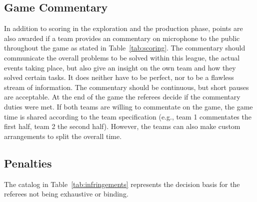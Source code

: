 \documentclass[12pt,twoside]{article}
\newcommand{\reftab}[1]{Table~\ref{#1}}
\begin{document}
\subsection{Game Commentary}
In addition to scoring in the exploration and the production phase,
points are also awarded if a team provides an commentary on
microphone to the public throughout the game as stated in \reftab{tab:scoring}. The commentary should
communicate the overall problems to be solved within this league, the
actual events taking place, but also give an insight on the own team
and how they solved certain tasks. It does neither have to be perfect,
nor to be a flawless stream of information. The commentary should be
continuous, but short pauses are acceptable. At the end of the game
the referees decide if the commentary duties were met. If both teams are willing to commentate
on the game, the game time is shared according to the team
specification (e.g., team 1 commentates the first half, team 2 the
second half). However, the teams can also make custom arrangements to
split the overall time.

\subsection{Penalties}
The catalog in \reftab{tab:infringements} represents the decision
basis for the referees not being exhaustive or binding.
%
\end{document}
